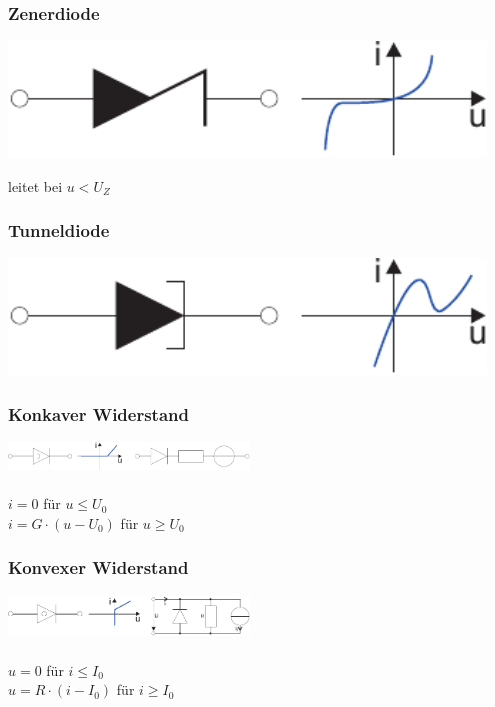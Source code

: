 \documentclass[a4paper,twocolumn,10pt]{article}
\begin{document}
\subsubsection*{Zenerdiode}
\begin{minipage}[b]{0.26\textwidth}
\includegraphics[width=0.95\textwidth]{Grafiken/Z-Diode}
\end{minipage}
\hfill
\begin{minipage}[b]{0.2\textwidth}
leitet bei $u<U_Z$
\end{minipage}

\subsubsection*{Tunneldiode}
\begin{minipage}[b]{0.26\textwidth}
\includegraphics[width=0.95\textwidth]{Grafiken/Tunneldiode}
\end{minipage}

\subsubsection*{Konkaver Widerstand}
\includegraphics[width=0.48\textwidth]{Grafiken/Rkonkav}\\\\
$i=0$ für $u\leq U_0$\\
$i=G\cdot (u-U_0)$ für $u\geq U_0$

\subsubsection*{Konvexer Widerstand}
\includegraphics[width=0.48\textwidth]{Grafiken/Rkonvex}\\\\
$u=0$ für $i\leq I_0$\\
$u=R\cdot (i-I_0)$ für $i\geq I_0$
\end{document}
